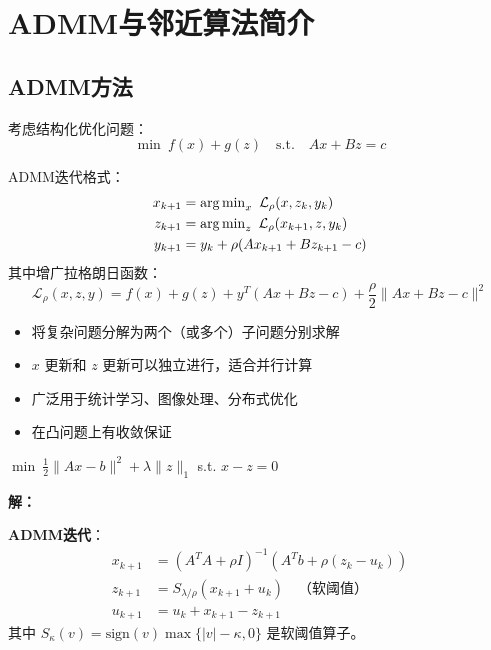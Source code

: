 \section{ADMM与邻近算法简介}\label{sec:admm-proximal}

\subsection{ADMM方法}

\begin{definition}
考虑结构化优化问题：
\[
\min\ f(x) + g(z)\quad \text{s.t.}\quad Ax + Bz = c
\]

ADMM迭代格式：
\begin{align*}
x_{k+1} &= \operatorname{arg\,min}_x\ \mathcal{L}_\rho(x, z_k, y_k) \\
z_{k+1} &= \operatorname{arg\,min}_z\ \mathcal{L}_\rho(x_{k+1}, z, y_k) \\
y_{k+1} &= y_k + \rho(Ax_{k+1} + Bz_{k+1} - c)
\end{align*}
其中增广拉格朗日函数：
\[
\mathcal{L}_\rho(x, z, y) = f(x) + g(z) + y^T(Ax + Bz - c) + \frac{\rho}{2}\|Ax + Bz - c\|^2
\]
\end{definition}

\begin{notebox}[ADMM的特点]
\begin{itemize}[itemsep=0.3em]
    \item 将复杂问题分解为两个（或多个）子问题分别求解
    \item $x$ 更新和 $z$ 更新可以独立进行，适合并行计算
    \item 广泛用于统计学习、图像处理、分布式优化
    \item 在凸问题上有收敛保证
\end{itemize}
\end{notebox}

\begin{example}[LASSO的ADMM求解]
$\min\ \frac{1}{2}\|Ax - b\|^2 + \lambda\|z\|_1$ s.t. $x - z = 0$

\textbf{解：}

\textbf{ADMM迭代}：
\begin{align*}
x_{k+1} &= (A^T A + \rho I)^{-1}(A^T b + \rho(z_k - u_k)) \\
z_{k+1} &= S_{\lambda/\rho}(x_{k+1} + u_k) \quad \text{（软阈值）} \\
u_{k+1} &= u_k + x_{k+1} - z_{k+1}
\end{align*}
其中 $S_\kappa(v) = \text{sign}(v)\max\{|v| - \kappa, 0\}$ 是软阈值算子。
\end{example}

